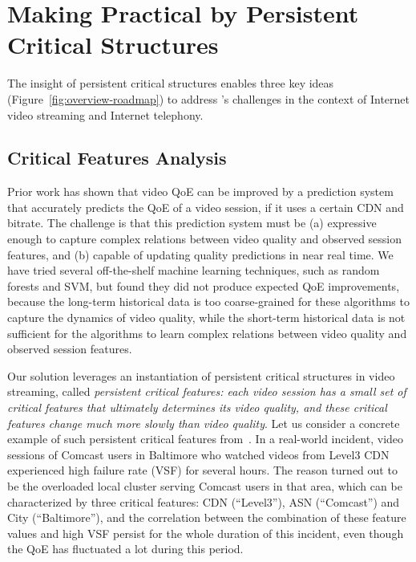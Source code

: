 \section{Making \ddn Practical by Persistent Critical Structures}
\label{sec:overview:solutions}

The insight of persistent critical structures enables three key ideas 
(Figure~\ref{fig:overview-roadmap})  to address \ddn's challenges in the  context of
Internet video streaming and Internet telephony.


\subsection{Critical Features Analysis}
\label{subsec:overview:cfa}

Prior work has shown that video QoE can be improved by a prediction system that 
accurately predicts the QoE of a video session, if it uses a certain CDN and bitrate.
The challenge is that this prediction system must be (a) expressive enough to capture 
complex relations between video quality and observed session features, and (b) 
capable of updating quality predictions in near real time.
We have tried several off-the-shelf machine learning techniques, such as random 
forests and SVM, but found they did not produce expected QoE improvements, 
because the long-term historical data is too coarse-grained  for these algorithms to 
capture the dynamics of video  quality, while the short-term historical data is not sufficient 
for the algorithms to learn complex relations between video quality and observed 
session features.

Our solution leverages an instantiation of persistent critical structures
in video streaming, called 
{\em persistent critical features: each video session has 
a small set of critical features that ultimately determines 
its video quality, and these critical features change much 
more slowly than video quality}. 
Let us consider a concrete example of such persistent 
critical features from~\cite{cfa}.
In a real-world incident, video sessions of Comcast
users in Baltimore who watched videos from Level3
CDN experienced high failure rate (VSF) for several
hours. The reason turned out
to be the overloaded local cluster serving Comcast
users in that area,
which can be characterized by three critical features: 
CDN (``Level3''), ASN (``Comcast'') and City (``Baltimore''),
and the correlation between the combination of these
feature values and high VSF persist for the whole
duration of this incident, even though the QoE
has fluctuated a lot during this period.

